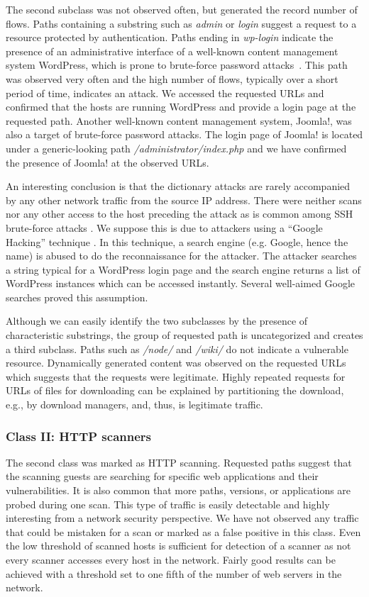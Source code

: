 The second subclass was not observed often, but generated the record number of flows. Paths containing a substring such as \textit{admin} or \textit{login} suggest a request to a resource protected by authentication. Paths ending in \textit{wp-login} indicate the presence of an administrative interface of a well-known content management system WordPress, which is prone to brute-force password attacks~\cite{WordPressCodex-2014-Brute}. This path was observed very often and the high number of flows, typically over a short period of time, indicates an attack. We accessed the requested URLs and confirmed that the hosts are running WordPress and provide a login page at the requested path. Another well-known content management system, Joomla!, was also a target of brute-force password attacks. The login page of Joomla! is located under a generic-looking path \textit{/administrator/index.php} and we have confirmed the presence of Joomla! at the observed URLs.

An interesting conclusion is that the dictionary attacks are rarely accompanied by any other network traffic from the source IP address. There were neither scans nor any other access to the host preceding the attack as is common among SSH brute-force attacks \cite{Vykopal-2013-Flow}. We suppose this is due to attackers using a ``Google Hacking'' technique \cite{Billig-2008-Evaluation}. In this technique, a search engine (e.g. Google, hence the name) is abused to do the reconnaissance for the attacker. The attacker searches a string typical for a WordPress login page and the search engine returns a list of WordPress instances which can be accessed instantly. Several well-aimed Google searches proved this assumption.

Although we can easily identify the two subclasses by the presence of characteristic substrings, the group of requested path is uncategorized and creates a third subclass. Paths such as \textit{/node/} and \textit{/wiki/} do not indicate a vulnerable resource. Dynamically generated content was observed on the requested URLs which suggests that the requests were legitimate. Highly repeated requests for URLs of files for downloading can be explained by partitioning the download, e.g., by download managers, and, thus, is legitimate traffic.

\subsubsection{Class II: HTTP scanners}

The second class was marked as HTTP scanning. Requested paths suggest that the scanning guests are searching for specific web applications and their vulnerabilities. It is also common that more paths, versions, or applications are probed during one scan. This type of traffic is easily detectable and highly interesting from a network security perspective. We have not observed any traffic that could be mistaken for a scan or marked as a false positive in this class. Even the low threshold of scanned hosts is sufficient for detection of a scanner as not every scanner accesses every host in the network. Fairly good results can be achieved with a threshold set to one fifth of the number of web servers in the network.

